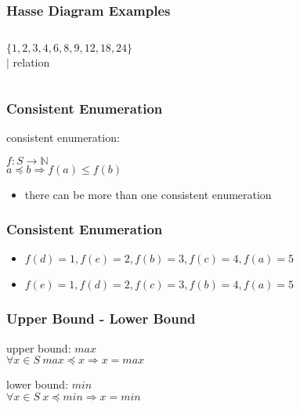 \documentclass[dvipsnames]{beamer}
\begin{document}
\begin{frame}
  \frametitle{Hasse Diagram Examples}

  \begin{example}
    \begin{columns}
      $\{1,2,3,4,6,8,9,12,18,24\}$\\
      $|$ relation

      \begin{center}
      \end{center}
    \end{columns}
  \end{example}
\end{frame}

\begin{frame}
  \frametitle{Consistent Enumeration}

  \begin{definition}
    \alert{consistent enumeration}:

    $f: S \rightarrow \mathbb{N}$\\
    $a \preceq b \Rightarrow f(a) \leq f(b)$
  \end{definition}

  \begin{itemize}
    \item there can be more than one consistent enumeration
  \end{itemize}
\end{frame}

\begin{frame}
  \frametitle{Consistent Enumeration}

  \begin{example}
    \begin{center}
    \end{center}

    \begin{itemize}
     \item $f(d)=1, f(e)=2, f(b)=3, f(c)=4, f(a)=5$

     \pause
     \item $f(e)=1, f(d)=2, f(c)=3, f(b)=4, f(a)=5$
    \end{itemize}
  \end{example}
\end{frame}

\begin{frame}
  \frametitle{Upper Bound - Lower Bound}

  \begin{definition}
    \alert{upper bound}: $max$\\
    $\forall x \in S~max \preceq x \Rightarrow x = max$
  \end{definition}

  \pause
  \begin{definition}
    \alert{lower bound}: $min$\\
    $\forall x \in S~x \preceq min \Rightarrow x = min$
  \end{definition}
\end{frame}
\end{document}
